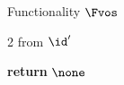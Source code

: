 \begin{interface}[nofloat]{Functionality $\Fvos$ \\
}
{\begin{multicols}{2}
 \quad from $\id'$
\begin{algorithmic}[1]
\algcont
\State \textbf{return} $\none$ \label{ln:vosnocorrupt}
\algsave
\end{algorithmic}
\end{multicols}}
\end{interface}
